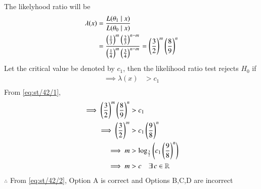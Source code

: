 \documentclass[article]{IEEEtran}
\theoremstyle{remark}
\begin{document}
The likelyhood ratio will be 
\begin{align}
    \lambda(x) &= \frac{L(\theta_1 \mid x)}{L(\theta_0 \mid x)} \\
    &= \frac{\left(\frac{1}{3}\right)^m\left(\frac{2}{3}\right)^{n-m}}{\left(\frac{1}{4}\right)^m\left(\frac{3}{4}\right)^{n-m}} = \left(\frac{3}{2}\right)^m\left(\frac{8}{9}\right)^{n} \label{eq:st/42/1}
\end{align}
Let the critical value be denoted by $c_1$, then the likelihood ratio test rejects $H_0$ if
\begin{align}
    \implies  \lambda(x) &> c_1\\
\end{align}  
From \eqref{eq:st/42/1},
\begin{align}
    \implies  \left(\frac{3}{2}\right)^m\left(\frac{8}{9}\right)^{n} &> c_1\\
    \implies  \left(\frac{3}{2}\right)^m &> c_1\left(\frac{9}{8}\right)^{n}\\
    \implies  m &> \log_{\frac{3}{2}}\left(c_1\left(\frac{9}{8}\right)^{n}\right)\\
    \implies  m &> c \quad \exists \, c \in \mathbb{R} \label{eq:st/42/2}
\end{align}
$\therefore$ From \eqref{eq:st/42/2}, Option A is correct and Options B,C,D are incorrect
\end{document}
